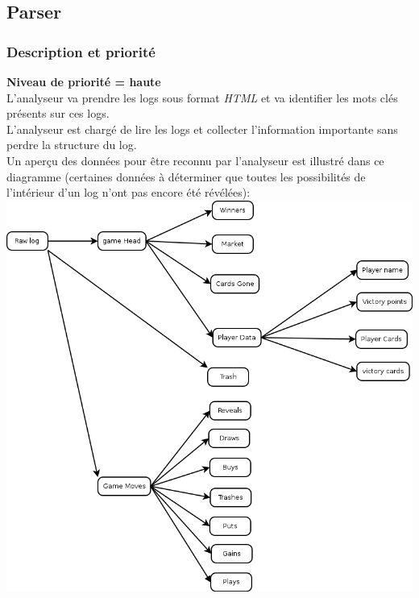 \documentclass{scrreprt}
\begin{document}
\subsection{Parser}

\subsubsection{Description et priorité}
\textbf{Niveau de priorité = haute}\\
L'analyseur va prendre les logs sous format \textit{HTML} et va identifier les mots clés présents sur ces logs.\\
L'analyseur est chargé de lire les logs et collecter l'information importante sans perdre la structure du log.\\
Un aperçu des données pour être reconnu par l'analyseur est illustré dans ce diagramme (certaines données à déterminer que toutes les possibilités de l'intérieur d'un log n’ont pas encore été révélées):\\
\includegraphics[scale=0.35,keepaspectratio]{UseCaseParser}
\end{document}
